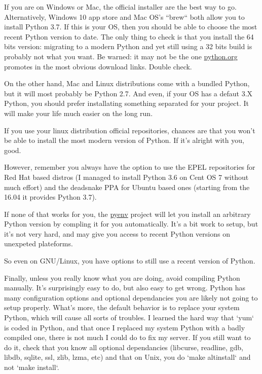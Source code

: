 If you are on Windows or Mac, the official installer are the best way to go. Alternatively, Windows 10 app store and Mac OS's ``brew`` both allow you to install Python 3.7. If this is your OS, then you should be able to choose the most recent Python version to date. The only thing to check is that you install the 64 bits version: migrating to a modern Python and yet still using a 32 bits build is probably not what you want. Be warned: it may not be the one \href{https://python.org}{python.org} promotes in the most obvious download links. Double check.

On the other hand, Mac and Linux distributions come with a bundled Python, but it will most probably be Python 2.7. And even, if your OS has a defaut 3.X Python, you should prefer installating something separated for your project. It will make your life much easier on the long run.

If you use your linux distribution official repositories, chances are that you won't be able to install the most modern version of Python. If it's alright with you, good.

However, remember you always have the option to use the EPEL repositories for Red Hat based distros (I managed to install Python 3.6 on Cent OS 7 without much effort) and the deadsnake PPA for Ubuntu based ones (starting from the 16.04 it provides Python 3.7).

If none of that works for you, the \href{https://github.com/pyenv/pyenv}{pyenv} project will let you install an arbitrary Python version by compling it for you automatically. It's a bit work to setup, but it's not very hard, and may give you access to recent Python versions on unexpeted plateforms.

So even on GNU/Linux, you have options to still use a recent version of Python.

Finally, unless you really know what you are doing, avoid compiling Python manually. It's surprisingly easy to do, but also easy to get wrong. Python has many configuration options and optional dependancies you are likely not going to setup properly. What's more, the default behavior is to replace your system Python, which will cause all sorts of troubles. I learned the hard way that `yum` is coded in Python, and that once I replaced my system Python with a badly compiled one, there is not much I could do to fix my server. If you still want to do it, check that you know all optional dependancies (libcurse, readline, gdb, libdb, sqlite, ssl, zlib, lzma, etc) and that on Unix, you do `make altinstall` and not `make install`.

